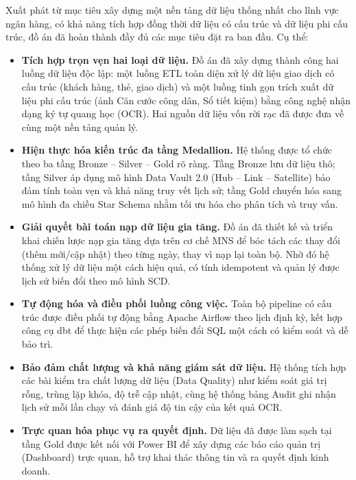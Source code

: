 \documentclass[oneside, a4paper]{book}
\theoremstyle{plain}
\theoremstyle{definition}
\theoremstyle{remark}
\begin{document}
Xuất phát từ mục tiêu xây dựng một nền tảng dữ liệu thống nhất cho lĩnh vực ngân hàng, có khả năng tích hợp đồng thời dữ liệu có cấu trúc và dữ liệu phi cấu trúc, đồ án đã hoàn thành đầy đủ các mục tiêu đặt ra ban đầu. Cụ thể:

\begin{itemize}
    \item \textbf{Tích hợp trọn vẹn hai loại dữ liệu.} Đồ án đã xây dựng thành công hai luồng dữ liệu độc lập: một luồng ETL toàn diện xử lý dữ liệu giao dịch có cấu trúc (khách hàng, thẻ, giao dịch) và một luồng tinh gọn trích xuất dữ liệu phi cấu trúc (ảnh Căn cước công dân, Sổ tiết kiệm) bằng công nghệ nhận dạng ký tự quang học (OCR). Hai nguồn dữ liệu vốn rời rạc đã được đưa về cùng một nền tảng quản lý.

    \item \textbf{Hiện thực hóa kiến trúc đa tầng Medallion.} Hệ thống được tổ chức theo ba tầng Bronze -- Silver -- Gold rõ ràng. Tầng Bronze lưu dữ liệu thô; tầng Silver áp dụng mô hình Data Vault 2.0 (Hub -- Link -- Satellite) bảo đảm tính toàn vẹn và khả năng truy vết lịch sử; tầng Gold chuyển hóa sang mô hình đa chiều Star Schema nhằm tối ưu hóa cho phân tích và truy vấn.

    \item \textbf{Giải quyết bài toán nạp dữ liệu gia tăng.} Đồ án đã thiết kế và triển khai chiến lược nạp gia tăng dựa trên cơ chế MNS để bóc tách các thay đổi (thêm mới/cập nhật) theo từng ngày, thay vì nạp lại toàn bộ. Nhờ đó hệ thống xử lý dữ liệu một cách hiệu quả, có tính idempotent và quản lý được lịch sử biến đổi theo mô hình SCD.

    \item \textbf{Tự động hóa và điều phối luồng công việc.} Toàn bộ pipeline có cấu trúc được điều phối tự động bằng Apache Airflow theo lịch định kỳ, kết hợp công cụ dbt để thực hiện các phép biến đổi SQL một cách có kiểm soát và dễ bảo trì.

    \item \textbf{Bảo đảm chất lượng và khả năng giám sát dữ liệu.} Hệ thống tích hợp các bài kiểm tra chất lượng dữ liệu (Data Quality) như kiểm soát giá trị rỗng, trùng lặp khóa, độ trễ cập nhật, cùng hệ thống bảng Audit ghi nhận lịch sử mỗi lần chạy và đánh giá độ tin cậy của kết quả OCR.

    \item \textbf{Trực quan hóa phục vụ ra quyết định.} Dữ liệu đã được làm sạch tại tầng Gold được kết nối với Power BI để xây dựng các báo cáo quản trị (Dashboard) trực quan, hỗ trợ khai thác thông tin và ra quyết định kinh doanh.
\end{itemize}
\end{document}
